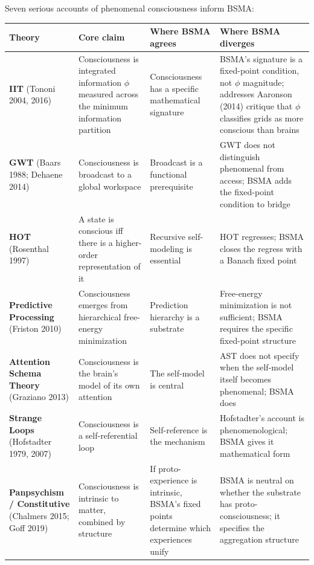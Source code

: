 \documentclass[
  11pt,
  a4paper,
]{article}
\begin{document}
Seven serious accounts of phenomenal consciousness inform BSMA:

\begin{longtable}[]{@{}
  >{\raggedright\arraybackslash}p{}
  >{\raggedright\arraybackslash}p{}
  >{\raggedright\arraybackslash}p{}
  >{\raggedright\arraybackslash}p{}@{}}
\toprule\noalign{}
\begin{minipage}[b]{\linewidth}\raggedright
Theory
\end{minipage} & \begin{minipage}[b]{\linewidth}\raggedright
Core claim
\end{minipage} & \begin{minipage}[b]{\linewidth}\raggedright
Where BSMA agrees
\end{minipage} & \begin{minipage}[b]{\linewidth}\raggedright
Where BSMA diverges
\end{minipage} \\
\midrule\noalign{}
\endhead
\bottomrule\noalign{}
\endlastfoot
\textbf{IIT} (Tononi 2004, 2016) & Consciousness is integrated
information \(\phi\) measured across the minimum information partition &
Consciousness has a specific mathematical signature & BSMA's signature
is a fixed-point condition, not \(\phi\) magnitude; addresses Aaronson
(2014) critique that \(\phi\) classifies grids as more conscious than
brains \\
\textbf{GWT} (Baars 1988; Dehaene 2014) & Consciousness is broadcast to
a global workspace & Broadcast is a functional prerequisite & GWT does
not distinguish phenomenal from access; BSMA adds the fixed-point
condition to bridge \\
\textbf{HOT} (Rosenthal 1997) & A state is conscious iff there is a
higher-order representation of it & Recursive self-modeling is essential
& HOT regresses; BSMA closes the regress with a Banach fixed point \\
\textbf{Predictive Processing} (Friston 2010) & Consciousness emerges
from hierarchical free-energy minimization & Prediction hierarchy is a
substrate & Free-energy minimization is not sufficient; BSMA requires
the specific fixed-point structure \\
\textbf{Attention Schema Theory} (Graziano 2013) & Consciousness is the
brain's model of its own attention & The self-model is central & AST
does not specify when the self-model itself becomes phenomenal; BSMA
does \\
\textbf{Strange Loops} (Hofstadter 1979, 2007) & Consciousness is a
self-referential loop & Self-reference is the mechanism & Hofstadter's
account is phenomenological; BSMA gives it mathematical form \\
\textbf{Panpsychism / Constitutive} (Chalmers 2015; Goff 2019) &
Consciousness is intrinsic to matter, combined by structure & If
proto-experience is intrinsic, BSMA's fixed points determine which
experiences unify & BSMA is neutral on whether the substrate has
proto-consciousness; it specifies the aggregation structure \\
\end{longtable}
\end{document}
